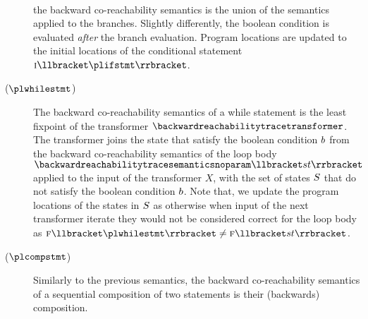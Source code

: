 \begin{description}
{\begin{align*}
    \end{align*}
  } the backward co-reachability semantics is the union of the semantics applied to the branches. Slightly differently, the boolean condition is evaluated \emph{after} the branch evaluation. Program locations are updated to the initial locations of the conditional statement $\initialloc[\plifstmt]$.
  \item[\normalfont ($\plwhilestmt$)] The backward co-reachability semantics of a while statement is the least fixpoint of the transformer $\backwardreachabilitytracetransformer$. The transformer joins the state that satisfy the boolean condition $b$ from the backward co-reachability semantics of the loop body $\backwardreachabilitytracesemanticsnoparam\semanticsof{\defstmt}$ applied to the input of the transformer $X$, with the set of states $S$ that do not satisfy the boolean condition $b$.
  Note that, we update the program locations of the states in $S$ as otherwise when input of the next transformer iterate they would not be considered correct for the loop body as $\finalloc[\plwhilestmt] \neq \finalloc[\defstmt]$.
  \item[\normalfont ($\plcompstmt$)] Similarly to the previous semantics, the backward co-reachability semantics of a sequential composition of two statements is their (backwards) composition.

\end{description}
